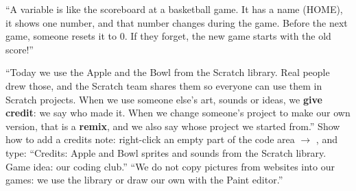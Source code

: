 \begin{analogy}[A scoreboard]
\enquote{A variable is like the scoreboard at a basketball game. It has a name (HOME), it shows one number, and that number changes during the game. Before the next game, someone resets it to 0. If they forget, the new game starts with the old score!}
\end{analogy}

\begin{safety}
\enquote{Today we use the Apple and the Bowl from the Scratch library. Real people drew those, and the Scratch team shares them so everyone can use them in Scratch projects. When we use someone else's art, sounds or ideas, we \textbf{give credit}: we say who made it. When we change someone's project to make our own version, that is a \textbf{remix}, and we also say whose project we started from.}
Show how to add a credits note: right-click an empty part of the code area $\rightarrow$ , and type: \enquote{Credits: Apple and Bowl sprites and sounds from the Scratch library. Game idea: our coding club.} \enquote{We do not copy pictures from websites into our games: we use the library or draw our own with the Paint editor.}
\end{safety}

